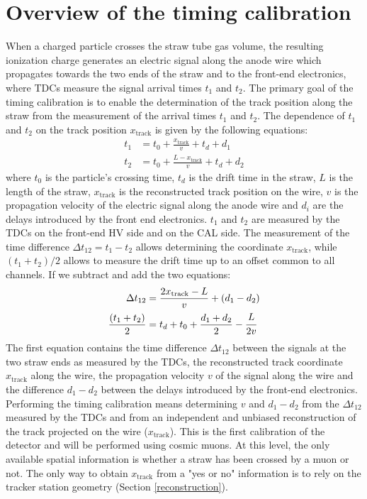 \section{Overview of the timing calibration}
When a charged particle crosses the straw tube 
gas volume, the resulting ionization charge 
generates an electric signal along the anode  
wire which propagates towards the two ends of 
the straw and to the front-end electronics, 
where TDCs measure the signal arrival 
times $t_1$ and $t_2$. The primary goal of 
the timing calibration is to enable the 
determination of the track position 
along the straw from the measurement of 
the arrival times $t_1$ and $t_2$. 
The dependence of $t_1$ and $t_2$ on the track 
position $x_{\text{track}}$ is given by the following equations:
\begin{equation}
\begin{aligned}
    t_1 &= t_0 + \frac{x_{\text{track}}}{v} + t_d + d_1 \\
    t_2 &= t_0 + \frac{L - x_{\text{track}}}{v} + t_d + d_2
\end{aligned}
\end{equation}
where $t_0$ is the particle's crossing time, 
$t_d$ is the drift time in the straw, 
$L$ is the length of the straw, 
$x_{\text{track}}$ is the 
reconstructed track position on the wire, $v$ 
is the propagation velocity of 
the electric signal along the anode 
wire and $d_i$ are the delays  
introduced by the front end electronics. 
$t_1$ and $t_2$ are measured  
by the TDCs on the front-end HV side and on the CAL side.
The measurement of the time difference 
$\Delta t_{12}=t_1-t_2$ allows 
determining the coordinate $x_{\text{track}}$, 
while $(t_1 + t_2) / 2$ allows to measure the drift time  
up to an offset common to all channels. 
If we subtract and add the two equations:
\begin{equation}\label{ffffff}
    \begin{aligned}
        \Delta t_{12} &= \frac{2x_{\text{track}}-L}{v} +(d_1-d_2)  \\
        \frac{(t_1 + t_2)}{2} &= t_d+t_0+\frac{d_1+d_2}{2}-\cfrac{L}{2v} 
    \end{aligned}
    \end{equation}
The first equation contains the time 
difference $\Delta t_{12}$ between the 
signals at the two straw ends as measured 
by the TDCs, the reconstructed track coordinate 
$x_{\text{track}}$ along the wire, the propagation  
velocity $v$ of the signal along the wire and 
the difference $d_1-d_2$ between the delays introduced by 
the front-end electronics. 
Performing the timing calibration means 
determining $v$ and $d_1-d_2$ from the $\Delta t_{12}$ 
measured by the TDCs and from an independent and unbiased 
reconstruction of the track 
projected on the wire ($x_{\text{track}}$).
This is the first calibration of the detector and 
will be performed using cosmic muons. 
At this level, the only available spatial 
information is whether a straw has been crossed 
by a muon or not. The 
only way to obtain $x_{\text{track}}$ from a "yes or no" 
information is to rely on the tracker station 
geometry (Section \ref{reconstruction}).


